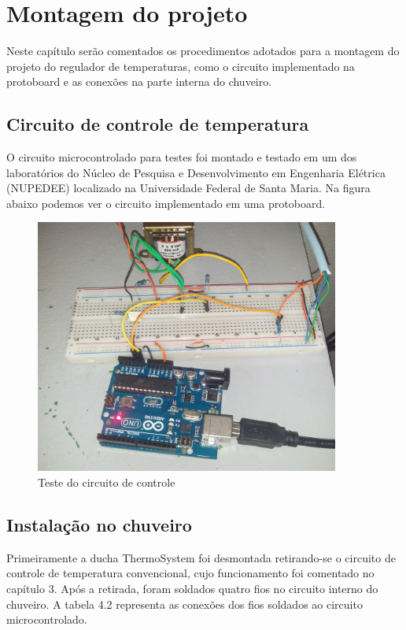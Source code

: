 \chapter{Montagem do projeto}
Neste capítulo serão comentados os procedimentos adotados para a montagem do projeto do regulador de temperaturas, como o circuito implementado na protoboard e as conexões na parte interna do chuveiro.

\section{Circuito de controle de temperatura}

O circuito microcontrolado para testes foi montado e testado em um dos laboratórios do Núcleo de Pesquisa e Desenvolvimento em Engenharia Elétrica (NUPEDEE) localizado na Universidade Federal de Santa Maria. Na figura abaixo podemos ver o circuito implementado em uma protoboard.

\begin{figure}[H]

\center

\includegraphics[width=10cm]{imagens/circuito_testes.jpg}

\label{Teste do circuito de controle}

\caption{Teste do circuito de controle}

\end{figure}

\section{Instalação no chuveiro}
Primeiramente a ducha ThermoSystem foi desmontada retirando-se o circuito de controle de temperatura convencional, cujo funcionamento foi comentado no capítulo 3. Após a retirada, foram soldados quatro fios no circuito interno do chuveiro. A tabela 4.2 representa as conexões dos fios soldados ao circuito microcontrolado.

